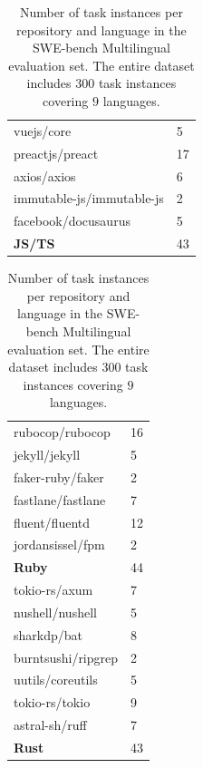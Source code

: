 \begin{table}[t]
\begin{minipage}[b]{0.3\textwidth}
\begin{tabular}{ll}
\footnotesize vuejs/core & 5 \\
\footnotesize preactjs/preact & 17 \\
\footnotesize axios/axios & 6 \\
\scriptsize immutable-js/immutable-js & 2 \\
\footnotesize facebook/docusaurus & 5 \\
\midrule
\textbf{JS/TS} & 43 \\
\bottomrule
        \end{tabular}
    \end{minipage}
    \hfill
    \begin{minipage}[b]{0.3\textwidth}
        \centering
        \begin{tabular}{ll}
\toprule
\footnotesize rubocop/rubocop & 16 \\
\footnotesize jekyll/jekyll & 5 \\
\footnotesize faker-ruby/faker & 2 \\
\footnotesize fastlane/fastlane & 7 \\
\footnotesize fluent/fluentd & 12 \\
\footnotesize jordansissel/fpm & 2 \\
\midrule
\textbf{Ruby} & 44 \\
\midrule
\footnotesize tokio-rs/axum & 7 \\
\footnotesize nushell/nushell & 5 \\
\footnotesize sharkdp/bat & 8 \\
\footnotesize burntsushi/ripgrep & 2 \\
\footnotesize uutils/coreutils & 5 \\
\footnotesize tokio-rs/tokio & 9 \\
\footnotesize astral-sh/ruff & 7 \\
\midrule
\textbf{Rust} & 43 \\
\bottomrule
        \end{tabular}
    \end{minipage}
    \caption{
Number of task instances per repository and language in the SWE-bench Multilingual evaluation set.
The entire dataset includes $300$ task instances covering $9$ languages.
    }
    \label{tab:swebml_dataset}
\end{table}
